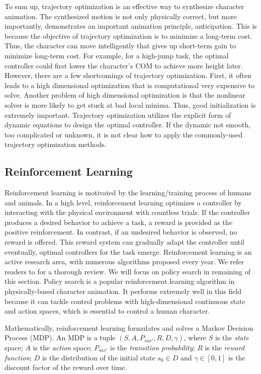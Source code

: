 To sum up, trajectory optimization is an effective way to synthesize character animation. The synthesized motion is not only physically correct, but more importantly, demonstrates an important animation principle, anticipation. This is because the objective of trajectory optimization is to minimize a long-term cost. Thus, the character can move intelligently that gives up short-term gain to minimize long-term cost. For example, for a high-jump task, the optimal controller could first lower the character's COM to achieve more height later. However, there are a few shortcomings of trajectory optimization. First, it often leads to a high dimensional optimization that is computational very expensive to solve. Another problem of high dimensional optimization is that the nonlinear solver is more likely to get stuck at bad local minima. Thus, good initialization is extremely important. Trajectory optimization utilizes the explicit form of dynamic equations to design the optimal controller. If the dynamic not smooth, too complicated or unknown, it is not clear how to apply the commonly-used trajectory optimization methods.


\subsection{Reinforcement Learning}

Reinforcement learning is motivated by the learning/training process of humans and animals. In a high level, reinforcement learning optimizes a controller by interacting with the physical environment with countless trials. If the controller produces a desired behavior to achieve a task, a reward is provided as the positive reinforcement. In contrast, if an undesired behavior is observed, no reward is offered. This reward system can gradually adapt the controller until eventually, optimal controllers for the task emerge. Reinforcement learning is an active research area, with numerous algorithms proposed every year. We refer readers to \cite{Kaelbling1996} for a thorough review. We will focus on policy search in remaining of this section. Policy search is a popular reinforcement learning algorithm in physically-based character animation. It performs extremely well in this field because it can tackle control problems with high-dimensional continuous state and action spaces, which is essential to control a human character. 

Mathematically, reinforcement learning formulates and solves a Markov Decision Process (MDP). An MDP is a tuple $(S, A, P_{sas'}, R, D, \gamma)$, where $S$ is the \emph{state} space; $A$ is the \emph{action} space; $P_{sas'}$ is the \emph{transition probability}; $R$ is the \emph{reward function}; $D$ is the distribution of the initial state $s_0 \in D$ and $\gamma \in [0, 1]$ is the discount factor of the reward over time. 

